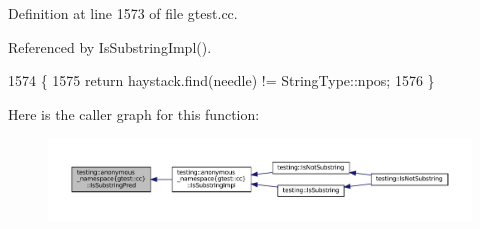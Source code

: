 Definition at line 1573 of file gtest.\+cc.



Referenced by Is\+Substring\+Impl().


\begin{DoxyCode}
1574                                                  \{
1575   \textcolor{keywordflow}{return} haystack.find(needle) != StringType::npos;
1576 \}
\end{DoxyCode}
Here is the caller graph for this function\+:
\nopagebreak
\begin{figure}[H]
\begin{center}
\leavevmode
\includegraphics[width=350pt]{namespacetesting_1_1anonymous__namespace_02gtest_8cc_03_a529b2b4b07a1d3085fc3ee11f65e6b0c_icgraph}
\end{center}
\end{figure}
